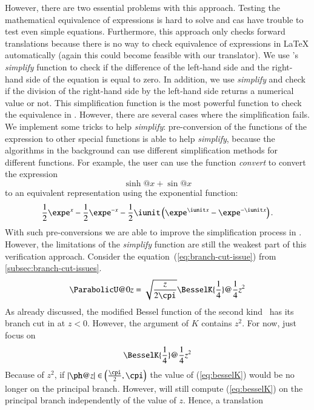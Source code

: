 However, there are two essential problems with this approach. Testing the mathematical equivalence of expressions is hard to solve and \gls{cas} have trouble to test even simple equations. Furthermore, this approach only checks forward translations because there is no way to check equivalence of expressions in \LaTeX{} automatically (again this could become feasible with our translator). We use \Maple's \textit{simplify} function to check if the difference of the left-hand side and the right-hand side of the equation is equal to zero. In addition, we use \textit{simplify} and check if the division of the right-hand side by the left-hand side returns a numerical value or not. This simplification function is the most powerful function to check the equivalence in \Maple. However, there are several cases where the simplification fails. We implement some tricks to help \textit{simplify}: pre-conversion of the functions of the expression to other special functions is able to help \textit{simplify}, because the algorithms in the background can use different simplification methods for different functions. For example, the user can use the \Maple{} function \textit{convert} to convert the expression
\begin{equation}
\sinh@{x} + \sin@{x}
\end{equation}
to an equivalent representation using the exponential function:
\begin{equation}
\frac{1}{2}\expe^x - \frac{1}{2}\expe^{-x} - \frac{1}{2} \iunit \left( \expe^{\iunit x}-\expe^{-\iunit x} \right).
\end{equation}
With such pre-conversions we are able to improve the simplification process in \Maple. However, the limitations of the \textit{simplify} function are still the weakest part of this verification approach. Consider the equation~(\ref{eq:branch-cut-issue}) from \cref{subsec:branch-cut-issues}. 
\begin{equation}\label{eq:branch-cut-near}
\displaystyle \ParabolicU@{0}{z} = \sqrt{\frac{z}{2\cpi}}\BesselK{\frac{1}{4}}@{\frac{1}{4}z^2}
\end{equation}
As already discussed, the modified Bessel function of the second kind~\cite[(12.7.10)]{NIST:DLMF} has its branch cut in \Maple{} at $z < 0$. However, the argument of $K$ contains $z^2$. For now, just focus on
\begin{equation}\label{eq:besselK}
\BesselK{\frac{1}{4}}@{\frac{1}{4}z^2}
\end{equation}
Because of $z^2$, if $|\ph@{z}| \in \left(\frac{\cpi}{2}, \cpi\right)$ the value of (\ref{eq:besselK}) would be no longer on the principal branch. However, \Maple{} will still compute (\ref{eq:besselK}) on the principal branch independently of the value of $z$. Hence, a translation

